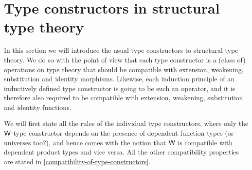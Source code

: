 \section{Type constructors in structural type theory}
In this section we will introduce the usual type constructors to structural
type theory. We do so with the point of view that each type constructor is a
(class of) operations on type theory that should be compatible with extension,
weakening, substitution and identity morphisms. Likewise, each induction
principle of an inductively defined type constructor is going to be such an
operator, and it is therefore also required to be compatible with extension,
weakening, substitution and identity functions.

We will first state all the rules of the individual type constructors, where
only the ${\mathsf{W}}$-type constructor depends on the presence of dependent
function types (or universes too?), and hence comes with the notion that ${\mathsf{W}}$
is compatible with dependent product types and vice versa. All the other
compatibility properties are stated in \autoref{compatibility-of-type-constructors}.

